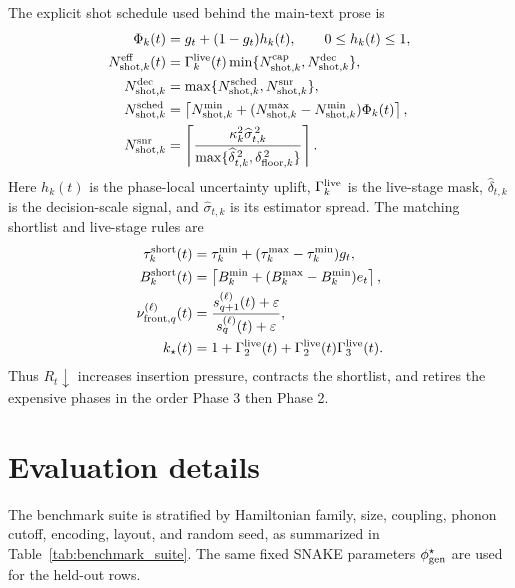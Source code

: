 \documentclass[
  reprint,
  amsmath,
  amssymb,
  aps,
  pra,
  nofootinbib,
  superscriptaddress,
  floatfix
]{revtex4-2}
\newcommand{\eps}{\varepsilon}
\begin{document}
The explicit shot schedule used behind the main-text prose is
\begin{equation}
\begin{aligned}
\Phi_k(t)&=g_t+(1-g_t)h_k(t),\qquad 0\le h_k(t)\le1,\\
N_{{\rm shot},k}^{\rm eff}(t)
&=\Gamma_k^{\rm live}(t)
\min\{N_{{\rm shot},k}^{\rm cap},N_{{\rm shot},k}^{\rm dec}\},\\
N_{{\rm shot},k}^{\rm dec}
&=\max\{N_{{\rm shot},k}^{\rm sched},N_{{\rm shot},k}^{\rm snr}\},\\
N_{{\rm shot},k}^{\rm sched}
&=\left\lceil N_{{\rm shot},k}^{\min}
+(N_{{\rm shot},k}^{\max}-N_{{\rm shot},k}^{\min})\Phi_k(t)\right\rceil,\\
N_{{\rm shot},k}^{\rm snr}
&=\left\lceil
\frac{\kappa_k^2\widehat\sigma_{t,k}^{\,2}}
{\max\{\widehat\delta_{t,k}^{\,2},\delta_{{\rm floor},k}^{\,2}\}}
\right\rceil .
\end{aligned}
\label{eq:appendix_shot_schedule}
\end{equation}
Here $h_k(t)$ is the phase-local uncertainty uplift, $\Gamma_k^{\rm live}$ is the live-stage mask, $\widehat\delta_{t,k}$ is the decision-scale signal, and $\widehat\sigma_{t,k}$ is its estimator spread. The matching shortlist and live-stage rules are
\begin{equation}
\begin{aligned}
\tau_k^{\rm short}(t)&=\tau_k^{\min}+(\tau_k^{\max}-\tau_k^{\min})g_t,\\
B_k^{\rm short}(t)&=
\left\lceil B_k^{\min}
+(B_k^{\max}-B_k^{\min})e_t\right\rceil,\\
\nu_{{\rm front},q}^{(\ell)}(t)
&=\frac{s_{q+1}^{(\ell)}(t)+\eps}{s_q^{(\ell)}(t)+\eps},\\
k_{\star}(t)&=1+\Gamma_2^{\rm live}(t)
+\Gamma_2^{\rm live}(t)\Gamma_3^{\rm live}(t).
\end{aligned}
\label{eq:appendix_shortlist_live_stage}
\end{equation}
Thus $R_t\downarrow$ increases insertion pressure, contracts the shortlist, and retires the expensive phases in the order Phase 3 then Phase 2.

\section{Evaluation details}
\label{app:evaluation_details}

The benchmark suite is stratified by Hamiltonian family, size, coupling, phonon cutoff, encoding, layout, and random seed, as summarized in Table~\ref{tab:benchmark_suite}. The same fixed SNAKE parameters $\phi_{\rm gen}^{\star}$ are used for the held-out rows.
\end{document}
